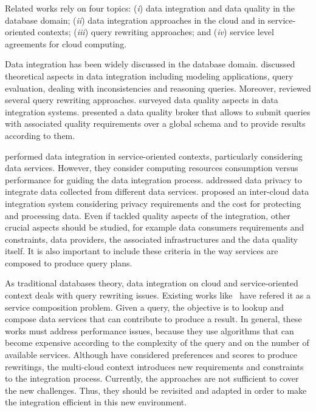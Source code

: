 Related works rely on four topics: 
(\textit{i}) data integration and data quality in the database domain;
(\textit{ii}) data integration approaches in the cloud and in service-oriented contexts; 
(\textit{iii}) query rewriting approaches; and 
(\textit{iv}) service level agreements for cloud computing.

Data integration has been widely discussed in the database domain.
\cite{Lenzerini:2002} discussed theoretical aspects in data integration including modeling applications, query evaluation, dealing with inconsistencies and reasoning queries.
Moreover, \cite{Halevy:2001} reviewed several query rewriting approaches. 
\cite{Batini2006} surveyed data quality aspects in data integration systems. 
\cite{Scannapieco:2004} presented a data quality broker that allows to submit queries with associated quality requirements over a global schema and to provide results according to them.

\cite{Correndo2010,ElSheikh2013} performed data integration in service-oriented contexts, particularly considering data services. However, they  consider computing resources consumption versus performance for guiding the data integration process. \cite{YauY08} addressed data privacy  to integrate data collected from different data services. \cite{Tian2010} proposed an inter-cloud data integration system considering privacy requirements and the cost for protecting and processing data. Even if \cite{Scannapieco:2004,Tian2010,YauY08} tackled quality aspects of the integration,  other crucial aspects  should be studied, for example data consumers requirements and constraints, data providers, the associated infrastructures and the data quality itself. It is also important to include these criteria in the way services are composed to produce  query plans.

As traditional databases theory, data integration on cloud and service-oriented context deals with query rewriting issues. Existing works like~\cite{ba2014,Barhamgi2010,Benouaret2011,Umberto} have refered it as a service composition problem. Given a query, the objective is to lookup and compose data services that can contribute to produce a result. In general, these works must address performance issues, because they use algorithms that can become expensive according to the complexity of the query and on the number of available services. Although \cite{ba2014,Benouaret2011} have considered preferences and scores to produce rewritings, the multi-cloud context introduces new requirements and constraints to the integration process. Currently, the approaches are not sufficient to cover the new challenges. Thus, they should be revisited and adapted in order to make the integration efficient in this new environment. 


